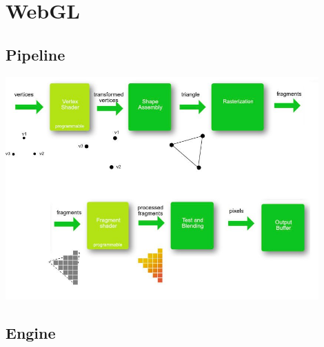 \section{WebGL}

\subsection{Pipeline}
\includegraphics[width=0.9\textwidth]{images/graphicPipeline.jpg}

\subsection{Engine}

